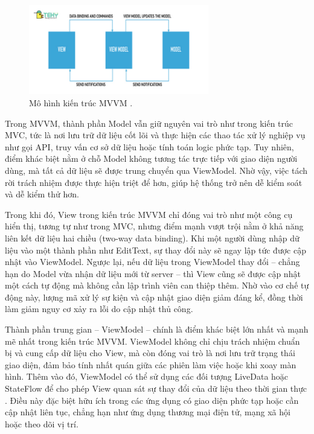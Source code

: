 \begin{figure}[H]
  \centering
  \includegraphics[width=0.7\textwidth]{images/mvvm.jpg}
  \caption{Mô hình kiến trúc MVVM \cite{tekyMVVM}.}
  \label{fig:fig18}
\end{figure}

    
      \hspace*{0.8cm}Trong MVVM, thành phần Model vẫn giữ nguyên vai trò như trong kiến trúc MVC, tức là nơi lưu trữ dữ liệu cốt lõi và thực hiện các thao tác xử lý nghiệp vụ như gọi API, truy vấn cơ sở dữ liệu hoặc tính toán logic phức tạp. Tuy nhiên, điểm khác biệt nằm ở chỗ Model không tương tác trực tiếp với giao diện người dùng, mà tất cả dữ liệu sẽ được trung chuyển qua ViewModel. Nhờ vậy, việc tách rời trách nhiệm được thực hiện triệt để hơn, giúp hệ thống trở nên dễ kiểm soát và dễ kiểm thử hơn.
    \vspace{0.5em}

    
      \hspace*{0.8cm}Trong khi đó, View trong kiến trúc MVVM chỉ đóng vai trò như một công cụ hiển thị, tương tự như trong MVC, nhưng điểm mạnh vượt trội nằm ở khả năng liên kết dữ liệu hai chiều (two-way data binding). Khi một người dùng nhập dữ liệu vào một thành phần như EditText, sự thay đổi này sẽ ngay lập tức được cập nhật vào ViewModel. Ngược lại, nếu dữ liệu trong ViewModel thay đổi – chẳng hạn do Model vừa nhận dữ liệu mới từ server – thì View cũng sẽ được cập nhật một cách tự động mà không cần lập trình viên can thiệp thêm. Nhờ vào cơ chế tự động này, lượng mã xử lý sự kiện và cập nhật giao diện giảm đáng kể, đồng thời làm giảm nguy cơ xảy ra lỗi do cập nhật thủ công.
    \vspace{0.5em}

    
      \hspace*{0.8cm}Thành phần trung gian – ViewModel – chính là điểm khác biệt lớn nhất và mạnh mẽ nhất trong kiến trúc MVVM. ViewModel không chỉ chịu trách nhiệm chuẩn bị và cung cấp dữ liệu cho View, mà còn đóng vai trò là nơi lưu trữ trạng thái giao diện, đảm bảo tính nhất quán giữa các phiên làm việc hoặc khi xoay màn hình. Thêm vào đó, ViewModel có thể sử dụng các đối tượng LiveData hoặc StateFlow để cho phép View quan sát sự thay đổi của dữ liệu theo thời gian thực \cite{stateflow}. Điều này đặc biệt hữu ích trong các ứng dụng có giao diện phức tạp hoặc cần cập nhật liên tục, chẳng hạn như ứng dụng thương mại điện tử, mạng xã hội hoặc theo dõi vị trí.
    \vspace{0.5em}

